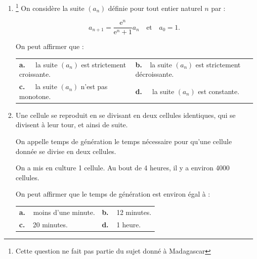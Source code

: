 \documentclass[10pt]{article}
\providecommand{\np}[2][]{{#2~#1}}
\begin{document}
\begin{enumerate}
\item \footnote{Cette question ne fait pas partie du sujet donné à Madagascar} On considère la suite $\left(a_n\right)$ définie pour tout entier naturel $n$ par :

\[a_{n+1} = \dfrac{\text{e}^n}{\text{e}^n + 1}a_n\quad \text{et} \quad a_0 = 1.\]

On peut affirmer que :

\begin{center}
\begin{tabularx}{\linewidth}{*{2}{X}}
\textbf{a.~~} la suite $\left(a_n\right)$ est strictement croissante.&\textbf{b.~~}la suite $\left(a_n\right)$ est strictement décroissante.\\
\textbf{c.~~} la suite $\left(a_n\right)$ n'est pas monotone.&\textbf{d.~~} la suite $\left(a_n\right)$ est constante.
\end{tabularx}
\end{center}
\item Une cellule se reproduit en se divisant en deux cellules identiques, qui se divisent à leur tour, et ainsi de suite. 

On appelle temps de génération le temps nécessaire pour qu'une cellule donnée se divise en deux cellules.

On a mis en culture 1 cellule. Au bout de 4 heures, il y a environ \np{4000} cellules.

On peut affirmer que le temps de génération est environ égal à :

\begin{center}
\begin{tabularx}{\linewidth}{*{2}{X}}
\textbf{a.~~}moins d'une minute.&\textbf{b.~~}12 minutes.\\
\textbf{c.~~}20 minutes.		&\textbf{d.~~}1 heure.
\end{tabularx}
\end{center}

\end{enumerate}

\bigskip
\end{document}
